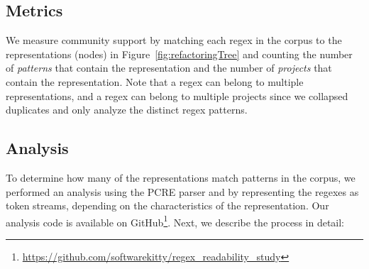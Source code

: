 \subsection{Metrics}
\label{sec:communitymetric}
We measure community support by matching each regex in the corpus to the representations (nodes) in Figure~\ref{fig:refactoringTree} and counting the number of \emph{patterns} that contain the representation and the number of \emph{projects} that contain the representation.
Note that a regex can belong to multiple representations, and a regex can belong to multiple projects since we collapsed duplicates and only analyze the distinct regex patterns. 
%
%









\subsection{Analysis}
\label{communityanalysis}
To determine how many of the representations match patterns in the corpus, we performed an analysis using the PCRE parser and by representing the regexes as token streams, depending on the characteristics of the representation. Our analysis code is available on GitHub\footnote{\url{https://github.com/softwarekitty/regex_readability_study}}. Next, we describe the process in detail:

